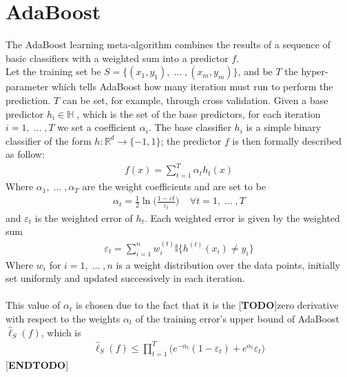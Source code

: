 
\chapter{AdaBoost}
	The AdaBoost learning meta-algorithm combines the results of a sequence of basic classifiers with a weighted sum into a predictor $f$. \\
	Let the training set be $S=\lbrace (x_{1}, y_{1}),\; \dots\;, (x_{m}, y_{m}) \rbrace$, and be $T$ the hyper-parameter which tells AdaBoost how many iteration must run to perform the prediction. $T$ can be set, for example, through cross validation. Given a base predictor $h_{i} \in \mathbb{H}\;$, which is the set of the base predictors, for each iteration $i = 1,\;\dots\;,T$ we set a coefficient $\alpha_{i}$. The base classifier $h_{i}$ is a simple binary classifier of the form $h:\mathbb{R}^{d}\to\lbrace-1, 1\rbrace$; the  predictor $f$ is then formally described as follow:
	\begin{align*}
		f(x) = \sum_{t=1}^{T}\alpha_{t}h_{t}(x)
	\end{align*}
	Where $\alpha_{1},\;\dots\;,\alpha_{T}$ are the weight coefficients and are set to be
	\begin{align}
		\label{eq:alpha_def}
		\alpha_{t} = \frac{1}{2}\ln \Big( \frac{1-\varepsilon{t}}{\varepsilon_{t}} \Big) \;\;\;\; \forall t=1,\;\dots\;,T
	\end{align}
	and $\varepsilon_{t}$ is the weighted error of $h_{t}$. Each weighted error is given by the weighted sum
	\begin{align*}
		\varepsilon_{t} = \sum_{i=1}^{n} w_{i}^{(t)}\mathbb{I}\big\lbrace h^{(t)}(x_{i}) \neq y_{i} \big\rbrace
	\end{align*}
	Where $w_{i}$ for $i = 1,\;\dots\;, n$ is a weight distribution over the data points, initially set uniformly and updated successively in each iteration.\\\\
	This value of $\alpha_{t}$ is chosen due to the fact that it is the [\textbf{TODO}]zero derivative with respect to the weights $\alpha_{t}$ of the training error's upper bound of AdaBoost $\hat{\ell}_{S}(f)$, which is
	\begin{align*}
		\hat{\ell}_{S}(f) \leq \prod_{t=1}^{T}\big( e^{-\alpha_{t}}(1-\varepsilon_{t}) + e^{\alpha_{t}}\varepsilon_{t} \big)
	\end{align*}
	[\textbf{ENDTODO}]

